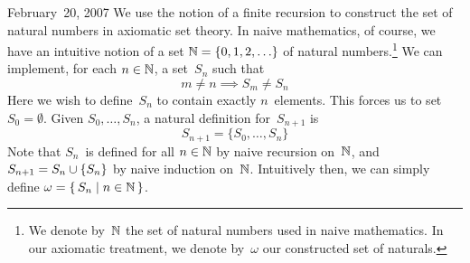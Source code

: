 \begin{lecture}{February~20, 2007}
We use the notion of a finite recursion to construct the set of natural numbers in axiomatic set theory. In naive mathematics, of course, we have an intuitive notion of a set \(\mathbb{N}=\{0,1,2,\ldots\}\) of natural numbers.\footnote{We denote by~\(\mathbb{N}\) the set of natural numbers used in naive mathematics. In our axiomatic treatment, we denote by~\(\omega\) our constructed set of naturals.} We can implement, for each \(n\in\mathbb{N}\), a set~\(S_n\) such that
\[m\ne n\implies S_m\ne S_n\]
Here we wish to define~\(S_n\) to contain exactly \(n\)~elements. This forces us to set \(S_0=\emptyset\). Given \(S_0,\ldots,S_n\), a natural definition for~\(S_{n+1}\) is
\[S_{n+1}=\{S_0,\ldots,S_n\}\]
Note that \(S_n\)~is defined for all \(n\in\mathbb{N}\) by naive recursion on~\(\mathbb{N}\), and \(S_{n+1}=S_n\cup\{S_n\}\) by naive induction on~\(\mathbb{N}\). Intuitively then, we can simply define \(\omega=\{\,S_n\mid n\in\mathbb{N}\,\}\).


\end{lecture}
